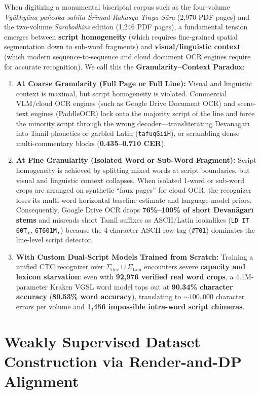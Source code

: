 \documentclass[10pt,twocolumn]{article}
\begin{document}
When digitizing a monumental biscriptal corpus such as the four-volume \emph{Vy\={a}khy\={a}na-pa\~{n}caka-sahita \'{S}r\={\i}mad-Rahasya-Traya-S\={a}ra} (2,970 PDF pages) and the two-volume \emph{S\={a}rabodhin\={\i}} edition (1,246 PDF pages), a fundamental tension emerges between \textbf{script homogeneity} (which requires fine-grained spatial segmentation down to sub-word fragments) and \textbf{visual/linguistic context} (which modern sequence-to-sequence and cloud document OCR engines require for accurate recognition). We call this the \textbf{Granularity--Context Paradox}:
\begin{enumerate}
    \item \textbf{At Coarse Granularity (Full Page or Full Line):} Visual and linguistic context is maximal, but script homogeneity is violated. Commercial VLM/cloud OCR engines (such as Google Drive Document OCR) and scene-text engines (PaddleOCR) lock onto the majority script of the line and force the minority script through the wrong decoder---transliterating Devan\={a}gar\={\i} into Tamil phonetics or garbled Latin (\texttt{tafuqGiiH}), or scrambling dense multi-commentary blocks (\textbf{0.435--0.710 CER}).
    \item \textbf{At Fine Granularity (Isolated Word or Sub-Word Fragment):} Script homogeneity is achieved by splitting mixed words at script boundaries, but visual and linguistic context collapses. When isolated 1-word or sub-word crops are arranged on synthetic ``faux pages'' for cloud OCR, the recognizer loses its multi-word horizontal baseline estimate and language-model priors. Consequently, Google Drive OCR drops \textbf{76\%--100\% of short Devan\={a}gar\={\i} stems} and misreads short Tamil suffixes as ASCII/Latin lookalikes (\texttt{LD IT 60T,}, \texttt{6T601M,}) because the 4-character ASCII row tag (\texttt{\#T01}) dominates the line-level script detector.
    \item \textbf{With Custom Dual-Script Models Trained from Scratch:} Training a unified CTC recognizer over $\Sigma_{\text{dev}} \cup \Sigma_{\text{tam}}$ encounters severe \textbf{capacity and lexicon starvation}: even with \textbf{92,976 verified real word crops}, a 4.1M-parameter Kraken VGSL word model tops out at \textbf{90.34\% character accuracy} (\textbf{80.53\% word accuracy}), translating to $\sim 100,000$ character errors per volume and \textbf{1,456 impossible intra-word script chimeras}.
\end{enumerate}

\section{Weakly Supervised Dataset Construction via Render-and-DP Alignment}
\end{document}
